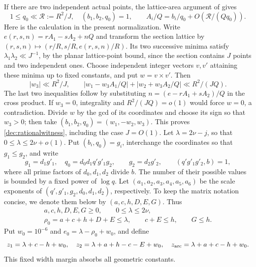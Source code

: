 \documentclass[11pt,a4paper]{article}
\theoremstyle{paperplain}
\numberwithin{equation}{section}
\begin{document}
If there are two independent actual points, the lattice-area argument
of \cite[Lemma 14.1]{Maynard2019} gives
\begin{equation}\label{dec:rationalwitness}
 1\le q_0\ll\mathcal R:=R^2/J,\quad (b_1,b_2,q_0)=1,
 \qquad A_i/Q=b_i/q_0+O(\mathcal R/(Qq_0)).
\end{equation}
Here is the calculation in the present normalization. Write
$e(r,s,n)=rA_1-sA_2+nQ$ and transform the section lattice by
$(r,s,n)\mapsto(r/R,s/R,e(r,s,n)/R)$.
Its two successive minima satisfy $\lambda_1\lambda_2\ll J^{-1}$,
by the planar lattice-point bound, since the section contains $J$
points and two independent ones. Choose independent integer vectors
$v,v'$ attaining these minima up to fixed constants, and put
$w=v\times v'$. Then
\[
 |w_3|\ll R^2/J,\qquad
 \left|w_1-w_3A_1/Q\right|+
 \left|w_2+w_3A_2/Q\right|\ll R^2/(JQ).
\]
The last two inequalities follow by substituting
$n=(e-rA_1+sA_2)/Q$ in the cross product.
If $w_3=0$, integrality and $R^2/(JQ)=o(1)$ would force $w=0$,
a contradiction. Divide $w$ by the gcd of its coordinates and choose
its sign so that $w_3>0$; then take
$(b_1,b_2,q_0)=(w_1,-w_2,w_3)$.
This proves \eqref{dec:rationalwitness}, including the case $J=O(1)$.
Let $\lambda=2\nu-j$, so that $0\le\lambda\le2\nu+o(1)$.
Put $(b_i,q_0)=g_i$, interchange the coordinates so that $g_1\le g_2$,
and write
\[
 g_1=d_1g'_1,\quad q_0=d_0d_1q'g'_1g_2,\qquad
 g_2=d_2g'_2,\qquad(q'g'_1g'_2,b)=1,
\]
where all prime factors of $d_0,d_1,d_2$ divide $b$.
The number of their possible values is bounded by a fixed power of $\log q$.
Let $(a_1,a_2,a_3,a_4,a_5,a_6)$ be the scale exponents of
$(q',g'_1,g_2,d_0,d_1,d_2)$, respectively. To keep the matrix notation
concise, we denote them below by $(a,c,h,D,E,G)$. Thus
\begin{equation}\label{dec:geometryconstraints}
 \begin{gathered}
 a,c,h,D,E,G\ge0,\qquad 0\le\lambda\le2\nu,\\
 \rho_0=a+c+h+D+E\le\lambda,\qquad c+E\le h,\qquad G\le h.
 \end{gathered}
\end{equation}
Put $w_0=10^{-6}$ and $e_0=\lambda-\rho_0+w_0$, and define
\[
 z_1=\lambda+c-h+w_0,\quad
 z_2=\lambda+a+h-c-E+w_0,\quad
 z_{\rm arc}=\lambda+a+c-h+w_0.
\]
This fixed width margin absorbs all geometric constants.
\end{document}
